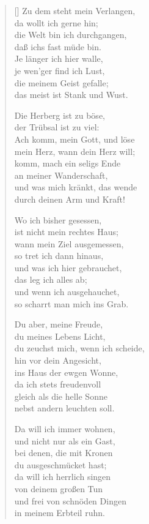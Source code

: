 \begin{multicols}{2}
\begin{verse}[\versewidth]
 Zu dem steht mein Verlangen,\\
da wollt ich gerne hin;\\
die Welt bin ich durchgangen,\\
daß ichs fast müde bin.\\
Je länger ich hier walle,\\
je wen'ger find ich Lust,\\
die meinem Geist gefalle;\\
das meist ist Stank und Wust.

 Die Herberg ist zu böse,\\
der Trübsal ist zu viel:\\
Ach komm, mein Gott, und löse\\
mein Herz, wann dein Herz will;\\
komm, mach ein seligs Ende\\
an meiner Wanderschaft,\\
und was mich kränkt, das wende\\
durch deinen Arm und Kraft!

 Wo ich bisher gesessen,\\
ist nicht mein rechtes Haus;\\
wann mein Ziel ausgemessen,\\
so tret ich dann hinaus,\\
und was ich hier gebrauchet,\\
das leg ich alles ab;\\
und wenn ich ausgehauchet,\\
so scharrt man mich ins Grab.

 Du aber, meine Freude,\\
du meines Lebens Licht,\\
du zeuchst mich, wenn ich scheide,\\
hin vor dein Angesicht,\\
ins Haus der ewgen Wonne,\\
da ich stets freudenvoll\\
gleich als die helle Sonne\\
nebst andern leuchten soll.

 Da will ich immer wohnen,\\
und nicht nur als ein Gast,\\
bei denen, die mit Kronen\\
du ausgeschmücket hast;\\
da will ich herrlich singen\\
von deinem großen Tun\\
und frei von schnöden Dingen\\
in meinem Erbteil ruhn.

\end{verse}
\end{multicols}
